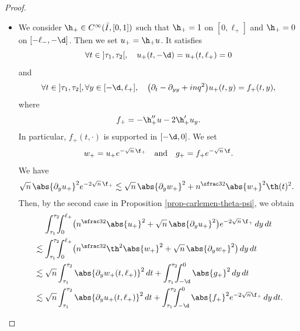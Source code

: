 \begin{proof}
\begin{itemize}
\item
We consider $\h_+ \in C^\infty(\bar I,[0,1])$ such that $\h_+ = 1$ on $[0,\ell_+]$ and $\h_+ = 0$ on $[-\ell_-,-\d]$. Then we set $u_+ = \h_+ u$. It satisfies
\[
\forall t \in{}]\tau_1,\tau_2[, \quad u_+(t,-\d) = u_+(t,\ell_+) = 0
\]
and
\[
\forall t \in{}]\tau_1,\tau_2[, \forall y \in [-\d,\ell_+], \quad \bigl(\partial_t - \partial_{yy} + inq^2 \bigr) u_+(t,y) = f_+(t,y),
\]
where
\[
f_+ = - \h_+'' u - 2 \h_+' u_y.
\]
In particular, $f_+(t,\cdot)$ is supported in $[-\d,0]$. We set
\[
w_+ = u_+ e^{-\sqrt n\,\f_+}
\quad \text{and} \quad
g_+ = f_+ e^{-\sqrt n\,\f}.
\]
We have
\begin{align*}
\sqrt n\,\abs{\partial_y u_+}^2 e^{-2 \sqrt n\,\f_+}
& \lesssim \sqrt n\,\abs{\partial_y w_+}^2 + n^{\sfrac 32} \abs{w_+}^2 \th(t)^2 .
\end{align*}
Then, by the second case in Proposition \ref{prop-carlemen-theta-psi}, we obtain
\begin{multline}\label{eq++}
\int_{\tau_1}^{\tau_2}\hspace*{-2mm} \int_0^{\ell_+} \bigl(n^{\sfrac 32} \abs {u_+}^2 + \sqrt n\,\abs{\partial_y u_+}^2 \bigr) e^{- 2 \sqrt n\,\f_+} \, dy \, dt\\
\begin{aligned}
& \lesssim \int_{\tau_1}^{\tau_2}\hspace*{-2mm} \int_0^{\ell_+} \bigl(n^{\sfrac 32} \th^2 \abs {w_+}^2 + \sqrt n\,\abs{\partial_y w_+}^2 \bigr) \, dy \, dt\\
& \lesssim \sqrt n \int_{\tau_1}^{\tau_2} \abs{\partial_y w_+(t,\ell_+)}^2 \, dt + \int_{\tau_1}^{\tau_2}\hspace*{-2mm} \int_{-\d}^0 \abs {g_+}^2 \, dy \, dt\\
& \lesssim \sqrt n \int_{\tau_1}^{\tau_2} \abs{\partial_y u_+(t,\ell_+)}^2 \, dt + \int_{\tau_1}^{\tau_2}\hspace*{-2mm} \int_{-\d}^0 \abs {f_+}^2 e^{-2\sqrt n \f_+} \, dy \, dt.
\end{aligned}
\end{multline}


\end{itemize}
\end{proof}
